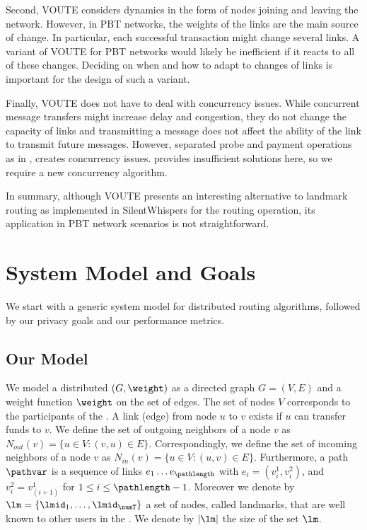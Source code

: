 Second, VOUTE considers dynamics in the form of nodes joining and leaving the network. However, in PBT networks, the weights of the links are the main source of change. In particular, each successful transaction might change several links. A variant of VOUTE for PBT networks would likely be inefficient if it reacts to all of these changes. Deciding on when and how to adapt to changes of links is important for the design of such a variant.   

Finally, VOUTE does not have to deal with concurrency issues. While concurrent message transfers might increase delay and congestion, they do not change the capacity of links and transmitting a message does not affect the ability of the link to transmit future messages. 
However, separated probe and payment operations as in \cnsysname , creates concurrency issues. \cnsysname provides insufficient solutions here, so we require a new concurrency algorithm.     

In summary, although VOUTE presents an interesting alternative to landmark routing as 
implemented in SilentWhispers for the routing operation, its application in PBT network  
scenarios is not straightforward. 
\section{System Model and Goals}
\label{sec:model}

We start with a generic system model for distributed routing algorithms, followed by our privacy goals and our performance metrics. 

\subsection{Our Model}
\label{sec:system-model}

We model a distributed \paysys $(G,\weight)$ as a 
directed graph $G=(V,E)$ and a weight function $\weight$ on the set of edges.  
The set of nodes $V$ corresponds to the participants of the \paysys.
A link (edge) from node $u$ to $v$ exists if $u$ can transfer funds to $v$. 
We define the set of outgoing neighbors of a node $v$ as $N_{\textit{out}}(v)=\{u \in V: (v,u) \in E\}$. Correspondingly, 
we define the set of incoming neighbors of a node $v$ as $N_{\textit{in}}(v)=\{u \in V: (u,v) \in E\}$. 
Furthermore, a path $\pathvar$ is a sequence of links $e_1 \ldots e_\pathlength$ with $e_i=(v_{i}^1, v_{i}^2)$, 
and $v_{i}^2=v_{(i+1)}^1$ for $1\leq i \leq \pathlength-1$. 
Moreover we denote by $\lm=\{\lmid_1, \ldots , \lmid_{\numT}\}$ a set of nodes, called landmarks, 
that are well known to other users in the \paysys. We denote by $|\lm|$ the size of the 
set $\lm$.

